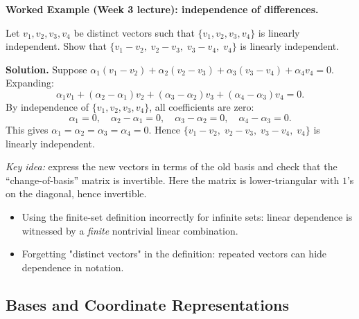 \begin{examplebox}
\textbf{Worked Example (Week 3 lecture): independence of differences.}

Let $v_1,v_2,v_3,v_4$ be distinct vectors such that $\{v_1,v_2,v_3,v_4\}$ is linearly independent.
Show that $\{v_1-v_2,\;v_2-v_3,\;v_3-v_4,\;v_4\}$ is linearly independent.

\medskip

\textbf{Solution.}
Suppose $\alpha_1(v_1-v_2)+\alpha_2(v_2-v_3)+\alpha_3(v_3-v_4)+\alpha_4 v_4=0$.
Expanding:
\[
\alpha_1 v_1+(\alpha_2-\alpha_1)v_2+(\alpha_3-\alpha_2)v_3+(\alpha_4-\alpha_3)v_4=0.
\]
By independence of $\{v_1,v_2,v_3,v_4\}$, all coefficients are zero:
\[
\alpha_1=0,\quad \alpha_2-\alpha_1=0,\quad \alpha_3-\alpha_2=0,\quad \alpha_4-\alpha_3=0.
\]
This gives $\alpha_1=\alpha_2=\alpha_3=\alpha_4=0$.
Hence $\{v_1-v_2,\;v_2-v_3,\;v_3-v_4,\;v_4\}$ is linearly independent.

\medskip
\emph{Key idea:} express the new vectors in terms of the old basis and check that the ``change-of-basis'' matrix is invertible.  Here the matrix is lower-triangular with $1$'s on the diagonal, hence invertible.
\end{examplebox}

\begin{commonmistake}

\begin{itemize}

\item Using the finite-set definition incorrectly for infinite sets: linear dependence is witnessed by a \emph{finite} nontrivial linear combination.

\item Forgetting "distinct vectors" in the definition: repeated vectors can hide dependence in notation.

\end{itemize}

\end{commonmistake}


\subsection{Bases and Coordinate Representations}


